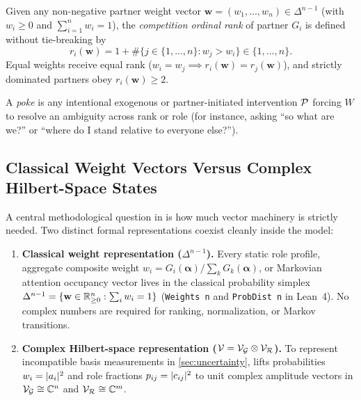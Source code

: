 \begin{definition}
\label{def:rank}
Given any non-negative partner weight vector $\mathbf{w} = (w_1, \dots, w_n) \in \Delta^{n-1}$
(with $w_i \ge 0$ and $\sum_{i=1}^n w_i = 1$), the \emph{competition ordinal rank} of partner
$G_i$ is defined without tie-breaking by
\begin{equation}
  r_i(\mathbf{w}) = 1 + \#\{j \in \{1, \dots, n\} : w_j > w_i\} \in \{1, \dots, n\}.
  \label{eq:ordinal-rank}
\end{equation}
Equal weights receive equal rank ($w_i = w_j \implies r_i(\mathbf{w}) = r_j(\mathbf{w})$),
and strictly dominated partners obey $r_i(\mathbf{w}) \ge 2$.
\end{definition}

\begin{definition}
\label{def:poke}
A \emph{poke} is any intentional exogenous or partner-initiated intervention
$\mathcal{P}$ forcing $W$ to resolve an ambiguity across rank or role (for instance, asking
``so what are we?'' or ``where do I stand relative to everyone else?'').
\end{definition}

\subsection{Classical Weight Vectors Versus Complex Hilbert-Space States}
\label{subsec:fw-states}

A central methodological question in \RST{} is how much vector machinery is strictly
needed. Two distinct formal representations coexist cleanly inside the model:

\begin{enumerate}[nosep]
  \item \textbf{Classical weight representation ($\Delta^{n-1}$).} Every static role
        profile, aggregate composite weight $w_i = G_i(\boldsymbol{\alpha}) / \sum_k G_k(\boldsymbol{\alpha})$,
        or Markovian attention occupancy vector lives in the classical probability simplex
        $\Delta^{n-1} = \{\mathbf{w} \in \mathbb{R}_{\ge 0}^n : \sum_i w_i = 1\}$ (\texttt{Weights n}
        and \texttt{ProbDist n} in Lean~4). No complex numbers are required for ranking,
        normalization, or Markov transitions.
  \item \textbf{Complex Hilbert-space representation ($\mathcal{V} = \mathcal{V}_{\mathcal{G}} \otimes \mathcal{V}_{\mathcal{R}}$).}
        To represent incompatible basis measurements in \cref{sec:uncertainty}, \RST{} lifts
        probabilities $w_i = \lvert a_i \rvert^2$ and role fractions $p_{ij} = \lvert c_{ij} \rvert^2$ to
        unit complex amplitude vectors in $\mathcal{V}_{\mathcal{G}} \cong \mathbb{C}^n$ and $\mathcal{V}_{\mathcal{R}} \cong \mathbb{C}^m$.
\end{enumerate}

